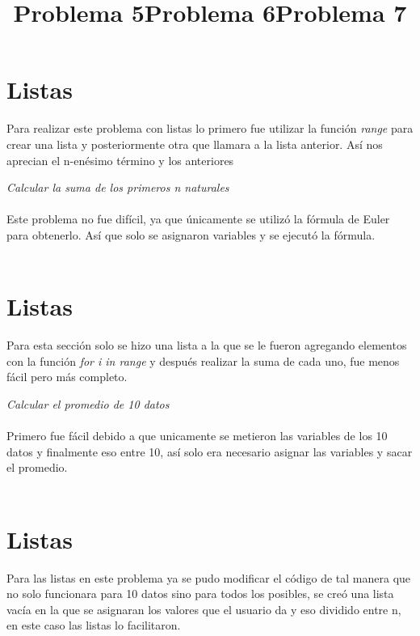 \documentclass{book}
\begin{document}
	\section*{Listas}
	Para realizar este problema con listas lo primero fue utilizar la función \textit{range} para crear una lista  y posteriormente otra que llamara a la lista anterior. Así nos aprecian el n-enésimo término y los anteriores
	
	\begin{center}
		\title {\Huge Problema 5} 
	\end{center}
	
	\textit{Calcular la suma de los primeros n naturales}\\
	\\
	Este problema no fue difícil, ya que únicamente se utilizó la fórmula de Euler para obtenerlo. Así que solo se asignaron variables y se ejecutó la fórmula.\\
	\\
	\section{Listas}
	Para esta sección solo se hizo una lista a la que se le fueron agregando elementos con la función \textit{for i in range} y después realizar la suma de cada uno, fue menos fácil pero más completo.
	
	\begin{center}
		\title {\Huge Problema 6} 
	\end{center}
	
	\textit{Calcular el promedio de 10 datos}\\
	\\
	Primero fue fácil debido a que unicamente se metieron las variables de los 10 datos y finalmente eso entre 10, así solo era necesario asignar las variables y sacar el promedio.\\
	\\
	\section*{Listas}
	Para las listas en este problema ya se pudo modificar el código de tal manera que no solo funcionara para 10 datos sino para todos los posibles, se creó una lista vacía en la que se asignaran los valores que el usuario da y eso dividido entre n, en este caso las listas lo facilitaron.
	
		\begin{center}
		\title {\Huge Problema 7} 
	\end{center}
	
\end{document}
